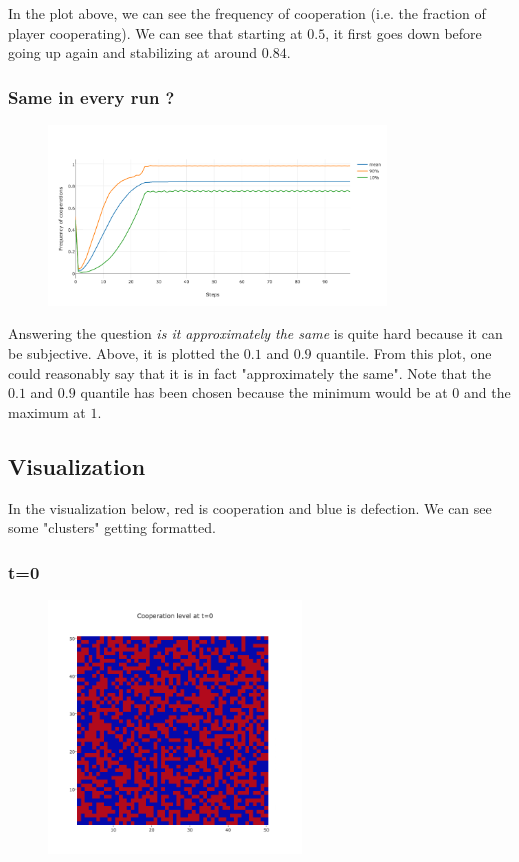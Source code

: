 \documentclass[11pt]{article}
\begin{document}
In the plot above, we can see the frequency of cooperation (i.e. the fraction of player cooperating). We can see that starting at $0.5$, it first goes down before going up again and stabilizing at around $0.84$.

\subsubsection{Same in every run ?}

\begin{figure}[H]
\centering
   \includegraphics[width=0.8\textwidth]{img/part1/cf-moore-notmyself-90-10.png}
\end{figure}

Answering the question \textit{is it approximately the same} is quite hard because it can be subjective. Above, it is plotted the $0.1$ and $0.9$ quantile. From this plot, one could reasonably say that it is in fact "approximately the same". Note that the $0.1$ and $0.9$ quantile has been chosen because the minimum would be at $0$ and the maximum at $1$.

\subsection{Visualization}

In the visualization below, red is cooperation and blue is defection. We can see some "clusters" getting formatted.

\subsubsection{t=0}

\begin{figure}[H]
\centering
   \includegraphics[width=0.6\textwidth]{img/part1/cf-moore-visu-0.png}
\end{figure}
\end{document}
